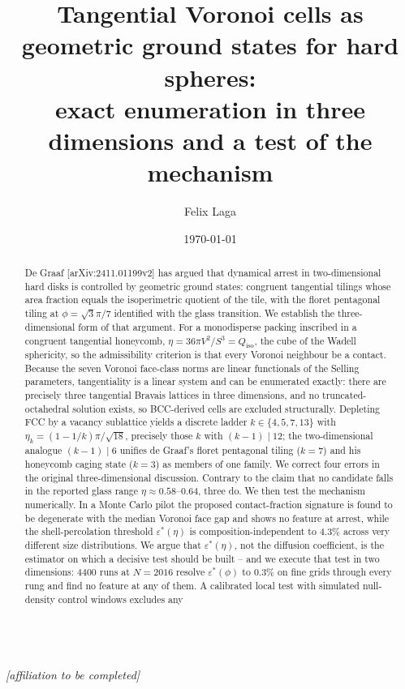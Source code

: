 \documentclass[11pt]{article}
\newcommand{\affiliation}[1]{\\[2pt] \textit{#1}}
\begin{document}
\title{Tangential Voronoi cells as geometric ground states for hard spheres:\\
exact enumeration in three dimensions and a test of the mechanism}

\author{Felix Laga}
\affiliation{\emph{[affiliation to be completed]}}

\date{\today}

\begin{abstract}
De Graaf [arXiv:2411.01199v2] has argued that dynamical arrest in two-dimensional
hard disks is controlled by geometric ground states: congruent tangential
tilings whose area fraction equals the isoperimetric quotient of the tile, with
the floret pentagonal tiling at $\phi=\sqrt{3}\pi/7$ identified with the glass
transition. We establish the three-dimensional form of that argument. For a
monodisperse packing inscribed in a congruent tangential honeycomb,
$\eta = 36\pi V^2/S^3 = Q_{\mathrm{iso}}$, the cube of the Wadell sphericity, so
the admissibility criterion is that every Voronoi neighbour be a contact. Because
the seven Voronoi face-class norms are linear functionals of the Selling
parameters, tangentiality is a linear system and can be enumerated exactly: there
are precisely three tangential Bravais lattices in three dimensions, and no
truncated-octahedral solution exists, so BCC-derived cells are excluded
structurally. Depleting FCC by a vacancy sublattice yields a discrete ladder
$k\in\{4,5,7,13\}$ with $\eta_k=(1-1/k)\pi/\sqrt{18}$, precisely those $k$ with
$(k-1)\mid 12$; the two-dimensional analogue $(k-1)\mid 6$ unifies de Graaf's
floret pentagonal tiling ($k=7$) and his honeycomb caging state ($k=3$) as
members of one family. We correct four errors in the original
three-dimensional discussion. Contrary to the claim that no candidate falls in
the reported glass range $\eta\approx0.58$--$0.64$, three do. We then test the
mechanism numerically. In a Monte Carlo pilot the proposed contact-fraction
signature is found to be degenerate with the median Voronoi face gap and shows no
feature at arrest, while the shell-percolation threshold $\varepsilon^*(\eta)$ is
composition-independent to $4.3\%$ across very different size distributions. We
argue that $\varepsilon^*(\eta)$, not the diffusion coefficient, is the estimator
on which a decisive test should be built -- and we execute that test in two
dimensions: $4400$ runs at $N=2016$ resolve $\varepsilon^*(\phi)$ to $0.3\%$ on
fine grids through every rung and find no feature at any of them. A calibrated
local test with simulated null-density control windows excludes any

\end{abstract}
\end{document}
